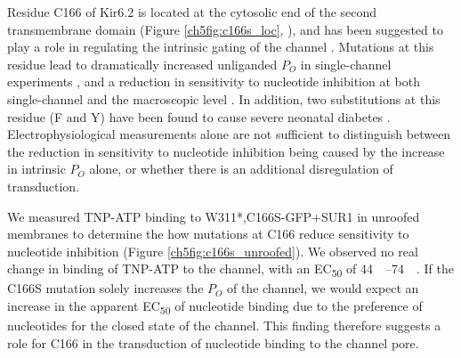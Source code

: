 Residue C166 of Kir6.2 is located at the cytosolic end of the second transmembrane domain (Figure \ref{ch5fig:c166s_loc}, \cite{lee_molecular_2017, martin_anti-diabetic_2017, li_structure_2017, puljung_cryo-electron_2018-1}), and has been suggested to play a role in regulating the intrinsic gating of the channel \cite{gloyn_kcnj11_2006, trapp_molecular_1998, ribalet_atp-sensitive_2006, yang_palmitoylation_2020, loussouarn_structure_2000, enkvetchakul_kinetic_2000}.
Mutations at this residue lead to dramatically increased unliganded $P_O$ in single-channel experiments \cite{trapp_molecular_1998, enkvetchakul_kinetic_2000, ribalet_atp-sensitive_2006}, and a reduction in sensitivity to nucleotide inhibition at both single-channel and the macroscopic level \cite{trapp_molecular_1998, enkvetchakul_kinetic_2000, ribalet_atp-sensitive_2006, li_decomposition_2013, yang_palmitoylation_2020}.
In addition, two substitutions at this residue (F and Y) have been found to cause severe neonatal diabetes \cite{gloyn_kcnj11_2006}.
Electrophysiological measurements alone are not sufficient to distinguish between the reduction in sensitivity to nucleotide inhibition being caused by the increase in intrinsic $P_O$ alone, or whether there is an additional disregulation of transduction.

We measured TNP-ATP binding to W311*,C166S-GFP+SUR1 in unroofed membranes to determine the how mutations at C166 reduce sensitivity to nucleotide inhibition (Figure \ref{ch5fig:c166s_unroofed}).
We observed no real change in binding of TNP-ATP to the channel, with an EC\textsubscript{50} of \SIrange{44}{74}{\micro\Molar}.
If the C166S mutation solely increases the $P_O$ of the channel, we would expect an increase in the apparent EC\textsubscript{50} of nucleotide binding due to the preference of nucleotides for the closed state of the channel.
This finding therefore suggests a role for C166 in the transduction of nucleotide binding to the channel pore.

